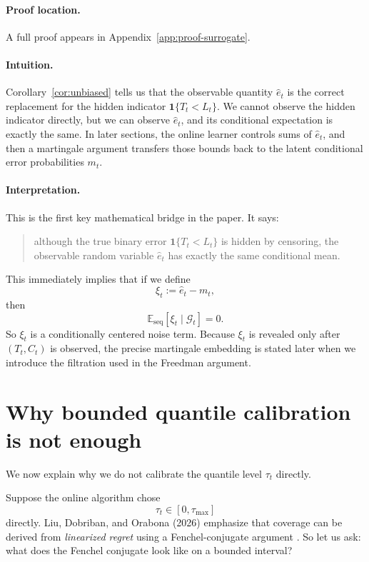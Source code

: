 \documentclass[11pt]{article}
\newcommand{\E}{\mathbb{E}}
\newcommand{\1}{\mathbf{1}}
\newcommand{\seq}{\mathrm{seq}}
\newcommand{\cG}{\mathcal{G}}
\begin{document}
\paragraph{Proof location.} A full proof appears in Appendix~\ref{app:proof-surrogate}.


\paragraph{Intuition.} Corollary~\ref{cor:unbiased} tells us that the observable quantity $\hat e_t$ is the correct replacement for the hidden indicator $\mathbf 1\{T_t< L_t\}$. We cannot observe the hidden indicator directly, but we can observe $\hat e_t$, and its conditional expectation is exactly the same. In later sections, the online learner controls sums of $\hat e_t$, and then a martingale argument transfers those bounds back to the latent conditional error probabilities $m_t$.


\paragraph{Interpretation.}
This is the first key mathematical bridge in the paper. It says:
\begin{quote}
although the true binary error $\1\{T_t< L_t\}$ is hidden by censoring, the observable random variable $\hat e_t$ has exactly the same conditional mean.
\end{quote}

This immediately implies that if we define
\[
\xi_t:=\hat e_t-m_t,
\]
then
\[
\E_{\seq}[\xi_t\mid \cG_t]=0.
\]
So $\xi_t$ is a conditionally centered noise term. Because $\xi_t$ is revealed only after $(T_t,C_t)$ is observed, the precise martingale embedding is stated later when we introduce the filtration used in the Freedman argument.

\section{Why bounded quantile calibration is not enough}
\label{sec:impossibility}

We now explain why we do not calibrate the quantile level $\tau_t$ directly.

Suppose the online algorithm chose
\[
\tau_t\in[0,\tau_{\max}]
\]
directly. Liu, Dobriban, and Orabona (2026) emphasize that coverage can be derived from \emph{linearized regret} using a Fenchel-conjugate argument \citep{LiuDobribanOrabona2026}. So let us ask: what does the Fenchel conjugate look like on a bounded interval?
\end{document}

